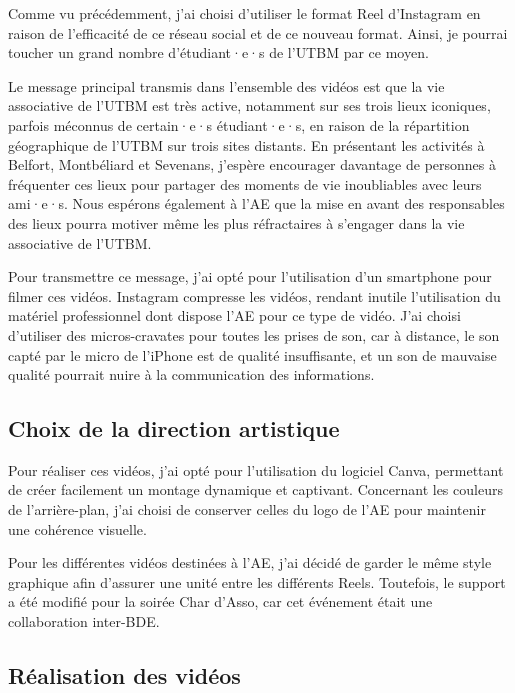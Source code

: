 Comme vu précédemment, j'ai choisi d'utiliser le format Reel d'Instagram en raison de l'efficacité de ce réseau social et de ce nouveau format.
Ainsi, je pourrai toucher un grand nombre d'étudiant·e·s de l'\gls{UTBM} par ce moyen.

Le message principal transmis dans l'ensemble des vidéos est que la vie associative de l'\gls{UTBM} est très active, notamment sur ses trois lieux iconiques, parfois méconnus de certain·e·s étudiant·e·s, en raison de la répartition géographique de l'\gls{UTBM} sur trois sites distants.
En présentant les activités à Belfort, Montbéliard et Sevenans, j'espère encourager davantage de personnes à fréquenter ces lieux pour partager des moments de vie inoubliables avec leurs ami·e·s.
Nous espérons également à l'\gls{AE} que la mise en avant des responsables des lieux pourra motiver même les plus réfractaires à s'engager dans la vie associative de l'\gls{UTBM}.

Pour transmettre ce message, j'ai opté pour l'utilisation d'un smartphone pour filmer ces vidéos.
Instagram compresse les vidéos, rendant inutile l'utilisation du matériel professionnel dont dispose l'\gls{AE} pour ce type de vidéo.
J'ai choisi d'utiliser des micros-cravates pour toutes les prises de son, car à distance, le son capté par le micro de l'iPhone est de qualité insuffisante, et un son de mauvaise qualité pourrait nuire à la communication des informations.


\subsection{Choix de la direction artistique}\label{subsec:choix-de-la-direction-artistique}

Pour réaliser ces vidéos, j'ai opté pour l'utilisation du logiciel Canva, permettant de créer facilement un montage dynamique et captivant.
Concernant les couleurs de l'arrière-plan, j'ai choisi de conserver celles du logo de l'\gls{AE} pour maintenir une cohérence visuelle.

Pour les différentes vidéos destinées à l'\gls{AE}, j'ai décidé de garder le même style graphique afin d'assurer une unité entre les différents Reels.
Toutefois, le support a été modifié pour la soirée Char d'Asso, car cet événement était une collaboration inter-BDE.


\subsection{Réalisation des vidéos}\label{subsec:realisation-des-videos}

